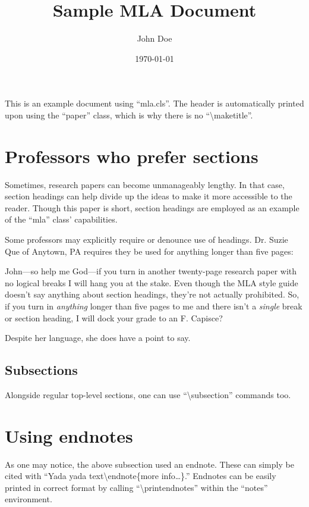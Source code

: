 \documentclass[mla8]{mla}
\title{Sample MLA Document}
\author{John Doe}
\date{\today}
\begin{document}
\begin{paper}

This is an example document using ``mla.cls''.
The header is automatically printed upon using the ``paper'' class,
which is why there is no ``\textbackslash{}maketitle''.

\section{Professors who prefer sections}

Sometimes, research papers can become unmanageably lengthy.
In that case, section headings can help divide up the ideas
to make it more accessible to the reader.
Though this paper is short, section headings are employed
as an example of the ``mla'' class' capabilities.

Some professors may explicitly require or denounce use of headings.
Dr. Suzie Que of Anytown, PA requires they be used for anything
longer than five pages:
\begin{blockquote}
John---so help me God---if you turn in another twenty-page research
paper with no logical breaks I will hang you at the stake.
Even though the MLA style guide doesn't say anything about
section headings, they're not actually prohibited.
So, if you turn in \emph{anything} longer than five pages to me
and there isn't a \emph{single} break or section heading,
I will dock your grade to an F.
Capisce? \cite{que2019}
\end{blockquote}
Despite her language, she does have a point to say.

\subsection{Subsections}

Alongside regular top-level sections, one can use
``\textbackslash{}subsection'' commands too.

\section{Using endnotes}

As one may notice, the above subsection used an endnote.
These can simply be cited with
``Yada yada text\textbackslash{}endnote\{more info\ldots\}.''
Endnotes can be easily printed in correct format by calling
``\textbackslash{}printendnotes'' within the
``notes'' environment.


\end{paper}
\end{document}
